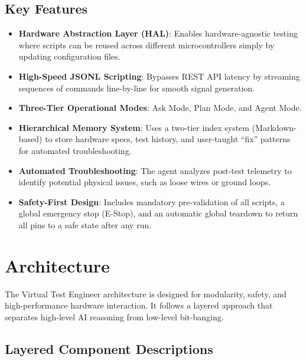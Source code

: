\documentclass[conference]{IEEEtran}
\begin{document}
\subsection{Key Features}
\begin{itemize}
    \item \textbf{Hardware Abstraction Layer (HAL)}: Enables hardware-agnostic testing where scripts can be reused across different microcontrollers simply by updating configuration files.
    \item \textbf{High-Speed JSONL Scripting}: Bypasses REST API latency by streaming sequences of commands line-by-line for smooth signal generation.
    \item \textbf{Three-Tier Operational Modes}: Ask Mode, Plan Mode, and Agent Mode.
    \item \textbf{Hierarchical Memory System}: Uses a two-tier index system (Markdown-based) to store hardware specs, test history, and user-taught ``fix'' patterns for automated troubleshooting.
    \item \textbf{Automated Troubleshooting}: The agent analyzes post-test telemetry to identify potential physical issues, such as loose wires or ground loops.
    \item \textbf{Safety-First Design}: Includes mandatory pre-validation of all scripts, a global emergency stop (E-Stop), and an automatic global teardown to return all pins to a safe state after any run.
\end{itemize}

\section{Architecture}
The Virtual Test Engineer architecture is designed for modularity, safety, and high-performance hardware interaction. It follows a layered approach that separates high-level AI reasoning from low-level bit-banging.

\subsection{Layered Component Descriptions}
\end{document}
